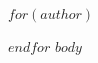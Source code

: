\documentclass[$layout$]{instrukcja}
\begin{document}
$for(author)$
\author{$author.name$}
$endfor$
$body$
\end{document}
